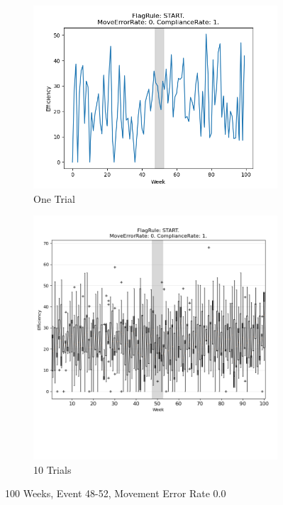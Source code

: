 \documentclass{article}%
\begin{document}
\begin{figure}[!htb]%
\begin{subfigure}[b]{0.45\linewidth}%
\includegraphics[width=\linewidth]{0001fr_START_er_0_cr_1_t1.png}%
\caption{One Trial}%
\end{subfigure}%
\begin{subfigure}[b]{0.45\linewidth}%
\includegraphics[clip,width=\linewidth,trim=0 4cm 0 0]{0001fr_START_er_0_cr_1_t10.png}%
\caption{10 Trials}%
\end{subfigure}%
\caption{100 Weeks, Event 48{-}52, Movement Error Rate 0.0}%
\end{figure}
\end{document}
